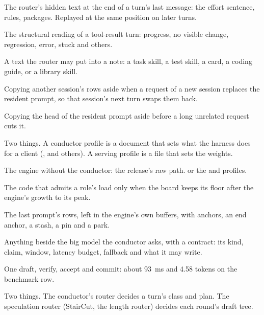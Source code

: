 \begin{description}[style=unboxed, leftmargin=0pt, itemsep=.5ex, font=\normalfont\bfseries]
\item[note] The router's hidden text at the end of a turn's last message: the effort sentence, rules, packages. Replayed at the same position on later turns.

\item[outcome] The structural reading of a tool-result turn: progress, no visible change, regression, error, stuck and others.

\item[package] A text the router may put into a note: a task skill, a test skill, a card, a coding guide, or a library skill.

\item[park] Copying another session's rows aside when a request of a new session replaces the resident prompt, so that session's next turn swaps them back.

\item[pin] Copying the head of the resident prompt aside before a long unrelated request cuts it.

\item[profile] Two things. A conductor profile is a document that sets what the harness does for a client (,  and others). A serving profile is a  file that sets the weights.

\item[raw] The engine without the conductor: the release's raw path.  or the  and  profiles.

\item[residency planner] The code that admits a role's load only when the board keeps its floor after the engine's growth to its peak.

\item[resident prefix] The last prompt's rows, left in the engine's own buffers, with anchors, an end anchor, a stash, a pin and a park.

\item[role] Anything beside the big model the conductor asks, with a contract: its kind, claim, window, latency budget, fallback and what it may write.

\item[round] One draft, verify, accept and commit: about 93~ms and 4.58 tokens on the benchmark row.

\item[router] Two things. The conductor's router decides a turn's class and plan. The speculation router (StairCut, the length router) decides each round's draft tree.


\end{description}

